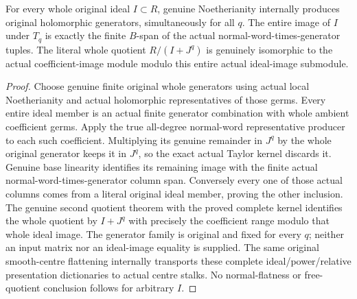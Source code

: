 \begin{theorem}
\label{hir:relative-normal-actual-whole-ideal-column-presentation}
\leanok
For every whole original ideal $I\subset R$, genuine Noetherianity internally
produces original holomorphic generators, simultaneously for all $q$. The
entire image of $I$ under $T_q$ is exactly the finite $B$-span of the actual
normal-word-times-generator tuples. The literal whole quotient
$R/(I+J^q)$ is genuinely isomorphic to the actual coefficient-image module
modulo this entire actual ideal-image submodule.
\end{theorem}
\begin{proof}
Choose genuine finite original whole generators using actual local
Noetherianity and actual holomorphic representatives of those germs. Every
entire ideal member is an actual finite generator combination with whole
ambient coefficient germs. Apply the true all-degree normal-word
representative producer to each such coefficient. Multiplying its genuine
remainder in $J^q$ by the whole original generator keeps it in $J^q$, so the
exact actual Taylor kernel discards it. Genuine base linearity identifies
its remaining image with the finite actual normal-word-times-generator
column span. Conversely every one of those actual columns comes from a
literal original ideal member, proving the other inclusion. The genuine
second quotient theorem with the proved complete kernel identifies the
whole quotient by $I+J^q$ with precisely the coefficient range modulo that
whole ideal image. The generator family is original and fixed for every
$q$; neither an input matrix nor an ideal-image equality is supplied. The
same original smooth-centre flattening internally transports these complete
ideal/power/relative presentation dictionaries to actual centre stalks.
No normal-flatness or free-quotient conclusion follows for arbitrary $I$.
\end{proof}


